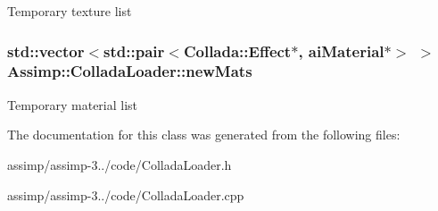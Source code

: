 Temporary texture list \hypertarget{class_assimp_1_1_collada_loader_a1823f1e5da88ce3f3c45588c3723ca98}{
\subsubsection[{new\+Mats}]{\setlength{\rightskip}{0pt plus 5cm}std\+::vector$<$std\+::pair$<${\bf Collada\+::\+Effect}$\ast$, {\bf ai\+Material}$\ast$$>$ $>$ Assimp\+::\+Collada\+Loader\+::new\+Mats\hspace{0.3cm}{\ttfamily [protected]}}}\label{class_assimp_1_1_collada_loader_a1823f1e5da88ce3f3c45588c3723ca98}
Temporary material list 

The documentation for this class was generated from the following files\+:\begin{DoxyCompactItemize}
\item 
assimp/assimp-\/3../code/Collada\+Loader.\+h\item 
assimp/assimp-\/3../code/Collada\+Loader.\+cpp\end{DoxyCompactItemize}
